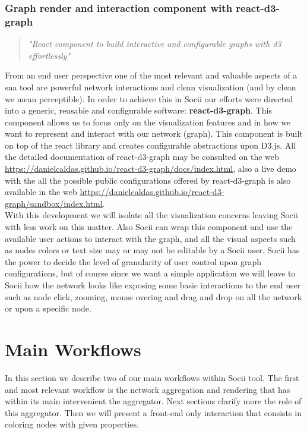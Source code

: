 \subsubsection{Graph render and interaction component with react-d3-graph}

\begin{quote}
\textit{"React component to build interactive and configurable graphs with d3 effortlessly"}
\end{quote}

From an end user perspective one of the most relevant and valuable aspects of a \gls{sna} tool are powerful network interactions and clean visualization (and by clean we mean perceptible). In order to achieve this in Socii our efforts were directed into a generic, reusable and configurable software: \textbf{react-d3-graph}\cite{reactd3graph}. This component allows us to focus only on the visualization features and in how we want to represent and interact with our network (graph). This component is built on top of the react library and creates configurable abstractions upon D3.js. All the detailed documentation of react-d3-graph
may be consulted on the web \cite{reactd3graph} \url{https://danielcaldas.github.io/react-d3-graph/docs/index.html}, also a live demo with the all the possible public configurations offered by react-d3-graph is also available in the web \url{https://danielcaldas.github.io/react-d3-graph/sandbox/index.html}.\\
With this development we will isolate all the visualization concerns leaving Socii with less work on this matter. Also Socii can wrap this component and use the available user actions to interact with the graph, and all the visual aspects such as nodes colors or text size may or may not be editable by a Socii user. Socii has the power to decide the level of granularity of user control upon graph configurations, but of course since we want a simple application we will leave to Socii how the network looks like exposing some basic interactions to the end user such as node click, zooming, mouse overing and drag and drop on all the network or upon a specific node.

\section{Main Workflows}

In this section we describe two of our main workflows within Socii tool. The first and most relevant workflow is the network aggregation and rendering that has within its main intervenient the aggregator. Next sections clarify more the role of this aggregator. Then we will present a front-end only interaction that consists in coloring nodes with given properties.

